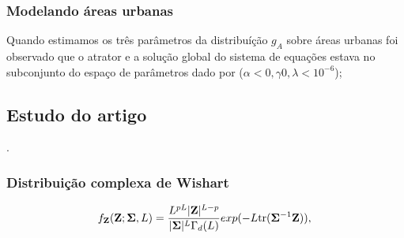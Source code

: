\subsubsection{Modelando áreas urbanas}

Quando estimamos os três parâmetros da distribuíção $g_A$ sobre áreas urbanas foi observado que o atrator e a solução global do sistema de equações estava  no subconjunto do espaço de parâmetros dado por ($\alpha<0,\gamma0,\lambda<10^{-6}$); 

\subsection{Estudo do artigo  \cite{fnc}}.

\subsubsection{Distribuição complexa de Wishart}

\begin{equation}\label{eqn114}
	f_{\mathbf{Z}}(\mathbf{Z};\mathbf{\Sigma},L)=\frac{L^{pL}|\mathbf{Z}|^{L-p}}{|\mathbf{\Sigma}|^{L}\Gamma_d(L)} exp(-L\mathrm{tr}{(\mathbf{\Sigma}^{-1}\mathbf{Z})}), \\
\end{equation}

